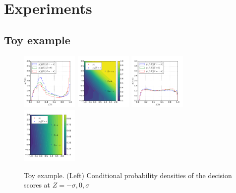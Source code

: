 \documentclass{article}
\theoremstyle{plain}
\begin{document}

\section{Experiments}

\subsection{Toy example}
\label{sec:toy}

\begin{figure}
    \begin{center}
        \includegraphics[width=0.245\textwidth]{../figures/f-plain.pdf}
        \includegraphics[width=0.245\textwidth]{../figures/surface-plain.pdf}
        \includegraphics[width=0.245\textwidth]{../figures/f-adversary.pdf}
        \includegraphics[width=0.245\textwidth]{../figures/surface-adversary.pdf}
    \end{center}
    \vspace{-0.5cm}
    \caption{Toy example.
    (Left) Conditional probability densities of the decision scores at $Z=-\sigma, 0, \sigma$
}
\end{figure}
\end{document}
